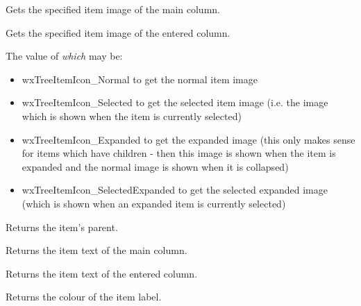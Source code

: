 Gets the specified item image of the main column.


Gets the specified item image of the entered column.

The value of {\it which} may be:

\begin{itemize}\itemsep=0pt
\item{wxTreeItemIcon\_Normal} to get the normal item image
\item{wxTreeItemIcon\_Selected} to get the selected item image (i.e. the image
which is shown when the item is currently selected)
\item{wxTreeItemIcon\_Expanded} to get the expanded image (this only
makes sense for items which have children - then this image is shown when the
item is expanded and the normal image is shown when it is collapsed)
\item{wxTreeItemIcon\_SelectedExpanded} to get the selected expanded image
(which is shown when an expanded item is currently selected)
\end{itemize}

\label{wxtreelistctrlgetitemparent}


Returns the item's parent.

\label{wxtreelistctrlgetitemtext}


Returns the item text of the main column.


Returns the item text of the entered column.

\label{wxtreelistctrlgetitemtextcolour}


Returns the colour of the item label.

\label{wxtreelistctrlgetfirstchild}

